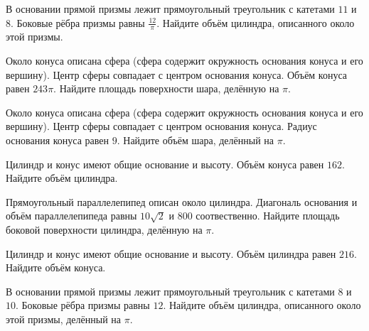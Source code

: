 \documentclass[4apaper]{article}
\begin{document}
\begin{taskBN}{82}
В основании прямой призмы лежит прямоугольный треугольник с катетами $11$ и $8$. Боковые рёбра призмы равны $\frac{12}{\pi}$. Найдите объём цилиндра, описанного около этой призмы.
\end{taskBN}

\begin{taskBN}{83}
Около конуса описана сфера (сфера содержит окружность основания конуса и его вершину). Центр сферы совпадает с центром основания конуса. Объём конуса равен $243\pi$. Найдите площадь поверхности шара, делённую на $\pi$.
\end{taskBN}

\begin{taskBN}{84}
Около конуса описана сфера (сфера содержит окружность основания конуса и его вершину). Центр сферы совпадает с центром основания конуса. Радиус основания конуса равен $9$. Найдите объём шара, делённый на $\pi$.
\end{taskBN}

\begin{taskBN}{85}
Цилиндр и конус имеют общие основание и высоту. Объём конуса равен $162$. Найдите объём цилиндра.
\end{taskBN}

\begin{taskBN}{86}
Прямоугольный параллелепипед описан около цилиндра. Диагональ основания и объём параллелепипеда равны $10\sqrt{2}$ и $800$ соотвественно. Найдите площадь боковой поверхности цилиндра, делённую на $\pi$.
\end{taskBN}

\begin{taskBN}{87}
Цилиндр и конус имеют общие основание и высоту. Объём цилиндра равен $216$. Найдите объём конуса.
\end{taskBN}

\begin{taskBN}{88}
В основании прямой призмы лежит прямоугольный треугольник с катетами $8$ и $10$. Боковые рёбра призмы равны $12$. Найдите объём цилиндра, описанного около этой призмы, делённый на $\pi$.
\end{taskBN}
\end{document}
